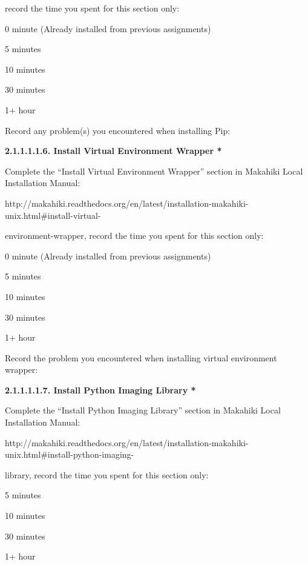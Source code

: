 record the time you spent for this section only:

\begin{radiobutton}
\item 0 minute (Already installed from previous assignments)
\item 5 minutes
\item  10 minutes
\item  30 minutes
\item  1+ hour
\end{radiobutton}

Record any problem(s) you encountered when installing Pip: \underline{\hspace{4cm}}

{\bf 2.1.1.1.1.6. Install Virtual Environment Wrapper *}

Complete the ``Install Virtual Environment Wrapper'' section in Makahiki Local Installation Manual:

http://makahiki.readthedocs.org/en/latest/installation-makahiki-unix.html\#install-virtual-

environment-wrapper, record the time you spent for this section only:

\begin{radiobutton}
\item 0 minute (Already installed from previous assignments)
\item 5 minutes
\item  10 minutes
\item  30 minutes
\item  1+ hour
\end{radiobutton}

Record the problem you encountered when installing virtual environment wrapper:

 \underline{\hspace{3cm}}

{\bf 2.1.1.1.1.7. Install Python Imaging Library *}

Complete the ``Install Python Imaging Library'' section in Makahiki Local Installation Manual:

http://makahiki.readthedocs.org/en/latest/installation-makahiki-unix.html\#install-python-imaging-

library, record the time you spent for this section only:

\begin{radiobutton}
\item 5 minutes
\item  10 minutes
\item  30 minutes
\item  1+ hour
\end{radiobutton}

